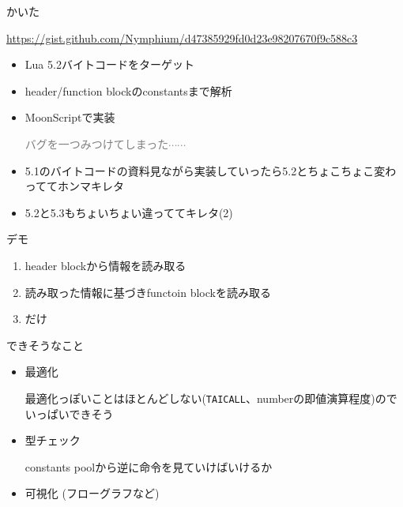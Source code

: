 \begin{frame}
	\frametitlesec

	かいた

	{\tiny\url{https://gist.github.com/Nymphium/d47385929fd0d23e98207670f9c588c3}}
	\begin{itemize}
		\item Lua 5.2バイトコードをターゲット
		\item header/function blockのconstantsまで解析
		\item MoonScriptで実装

			\textcolor{gray}{\tiny{}バグを一つみつけてしまった$\cdots\cdots$}
		\item 5.1のバイトコードの資料見ながら実装していったら5.2とちょこちょこ変わっててホンマキレタ
		\item 5.2と5.3もちょいちょい違っててキレタ(2)
	\end{itemize}
\end{frame}
\begin{frame}
	\frametitlesec
	\begin{center}
		\Huge{}デモ
	\end{center}
\end{frame}
\begin{frame}
	\frametitlesec
	\begin{enumerate}
		\item header blockから情報を読み取る
		\item 読み取った情報に基づきfunctoin blockを読み取る
		\item[] だけ
	\end{enumerate}
\end{frame}
\begin{frame}[fragile]
	\frametitlesec

	できそうなこと
	\begin{itemize}
		\item 最適化

			最適化っぽいことはほとんどしない(\lstinline{TAICALL}、numberの即値演算程度)のでいっぱいできそう
		\item 型チェック

			constants poolから逆に命令を見ていけばいけるか
		\item 可視化 (フローグラフなど)
	\end{itemize}
\end{frame}
